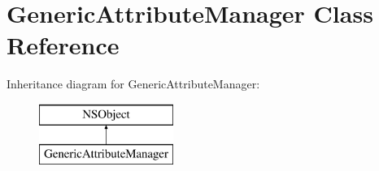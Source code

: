 \hypertarget{interface_generic_attribute_manager}{
\section{\-Generic\-Attribute\-Manager \-Class \-Reference}
\label{interface_generic_attribute_manager}
}
\-Inheritance diagram for \-Generic\-Attribute\-Manager\-:\begin{figure}[H]
\begin{center}
\leavevmode
\includegraphics[height=2.000000cm]{interface_generic_attribute_manager}
\end{center}
\end{figure}
